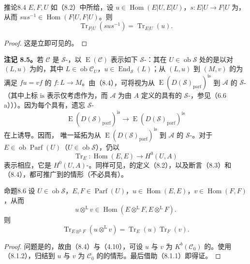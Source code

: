 \begin{SGAresult}{推论}{8.4}
$E,F,U$ 如（8.2）中所给，设 $u\in\operatorname{Hom}(E|U,E|U)$，$s:E|U\to F|U$ 为，从而 $sus^{-1}\in\operatorname{Hom}(F|U,F|U)$。则
\[\operatorname{Tr}_{F|U}(sus^{-1})=\operatorname{Tr}_{E|U}(u).\]
\end{SGAresult}
\begin{proof}
这是立即可见的。
\end{proof}

\textbf{注记 8.5。}若 $\mathcal C$ 是 $\mathscr S$-，以 $\operatorname E(\mathcal C)$ 表示如下 $\mathscr S$-：其在 $U\in\operatorname{ob}\mathscr S$ 处的是以对 $(L,u)$ 为的，其中 $L\in\operatorname{ob}\mathcal C_U$，$u\in\operatorname{End}_{\mathscr S}(L)$；从 $(L,u)$ 到 $(M,v)$ 的为满足 $fu=vf$ 的 $f:L\to M$。由（8.4），可将视为从 $\operatorname E(D(\mathscr S)_{\underline{\mathrm{parf}}})^{\mathrm{is}}$ 到 $\mathcal A$ 的 $\mathscr S$-（其中上标 $\mathrm{is}$ 表示仅考虑作为，而 $\mathcal A$ 为由 $A$ 定义的具有的 $\mathscr S$-，参见（6.6 a）））。因为每个具有，遗忘 $\mathscr S$-
\[\operatorname E(D(\mathscr S)_{\underline{\mathrm{parf}}})^{\mathrm{is}}\longrightarrow\operatorname E(D(\mathscr S)_{\mathrm{parf}})^{\mathrm{is}}\]
在上诱导。因而，
唯一延拓为从 $\operatorname E(D(\mathscr S)_{\mathrm{parf}})^{\mathrm{is}}$ 到 $\mathcal A$ 的 $\mathscr S$-。对于 $E\in\operatorname{ob}\operatorname{Parf}(U)$（$U\in\operatorname{ob}\mathscr S$），仍以
\[\operatorname{Tr}_E:\operatorname{Hom}(E,E)\longrightarrow H^0(U,A)\]
表示相应，它是 $H^0(U,A)$-。同样可见，的定义（8.2），以及断言（8.3）和（8.4），都可推广到的情形（不必具有）。

\begin{SGAresult}{命题}{8.6}
设 $U\in\operatorname{ob}\mathscr S$，$E,F\in\operatorname{Parf}(U)$，$u\in\operatorname{Hom}(E,E)$，$v\in\operatorname{Hom}(F,F)$，从而
\[u\otimes^{\mathrm L}v\in\operatorname{Hom}(E\otimes^{\mathrm L}F,E\otimes^{\mathrm L}F).\]
则
\[\operatorname{Tr}_{E\otimes^{\mathrm L}F}(u\otimes^{\mathrm L}v)=\operatorname{Tr}_E(u)\operatorname{Tr}_F(v).\]
\end{SGAresult}
\begin{proof}
问题是的，故由（8.4）与（4.10），可设 $u$ 与 $v$ 为 $K^b(\mathcal C_0)$ 的。使用（8.1.2），归结到 $u$ 与 $v$ 为 $\mathcal C_0$ 的的情形。最后借助（8.1.1）即得证。
\end{proof}

